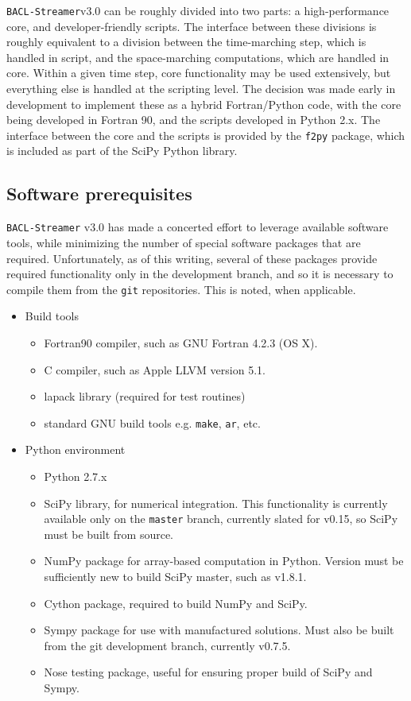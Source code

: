 {\tt BACL-Streamer}v3.0 can be roughly divided into two parts: a high-performance core, and developer-friendly scripts. The interface between these divisions is roughly equivalent to a division between the time-marching step, which is handled in script, and the space-marching computations, which are handled in core. Within a given time step, core functionality may be used extensively, but everything else is handled at the scripting level. The decision was made early in development to implement these as a hybrid Fortran/Python code, with the core being developed in Fortran 90, and the scripts developed in Python 2.x. The interface between the core and the scripts is provided by the {\tt f2py} package, which is included as part of the SciPy Python library. 

\subsection{Software prerequisites}

{\tt BACL-Streamer} v3.0 has made a concerted effort to leverage available software tools, while minimizing the number of special software packages that are required. Unfortunately, as of this writing, several of these packages provide required functionality only in the development branch, and so it is necessary to compile them from the {\tt git} repositories. This is noted, when applicable.

\begin{itemize}
\item Build tools
  \begin{itemize}
  \item Fortran90 compiler, such as GNU Fortran 4.2.3 (OS X).
  \item C compiler, such as Apple LLVM version 5.1.
  \item lapack library (required for test routines)
  \item standard GNU build tools e.g. {\tt make}, {\tt ar}, etc.
  \end{itemize}
\item Python environment
  \begin{itemize}
  \item Python 2.7.x
  \item SciPy library, for numerical integration. This functionality is currently available only on the {\tt master} branch, currently slated for v0.15, so SciPy must be built from source.
  \item NumPy package for array-based computation in Python. Version must be sufficiently new to build SciPy master, such as v1.8.1.
  \item Cython package, required to build NumPy and SciPy.
  \item Sympy package for use with manufactured solutions. Must also be built from the git development branch, currently v0.7.5.
  \item Nose testing package, useful for ensuring proper build of SciPy and Sympy.
  \end{itemize}
\end{itemize}

